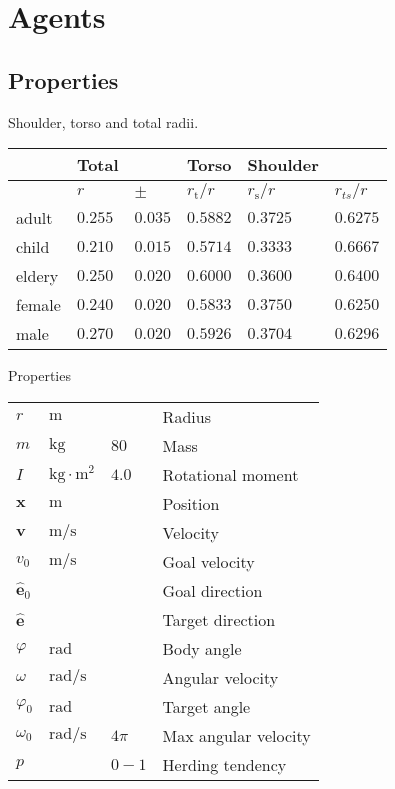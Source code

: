 \section{Agents}
\subsection{Properties}

Shoulder, torso and total radii.

\begin{tabularx}{1.0\linewidth}{ l l l l l l}
& Total && Torso & Shoulder & \\
\hline
& $ r $ & $ \pm $ & $ r_{\text{t}} / r $ & $ r_{\text{s}} / r $ & $ r_{ts} / r $ \\
\hline\hline
adult & $ 0.255 $ & $ 0.035 $ & $ 0.5882 $ & $ 0.3725 $ & $ 0.6275 $ \\
child & $ 0.210 $ & $ 0.015 $ & $ 0.5714 $ & $ 0.3333 $ & $ 0.6667 $ \\
eldery & $ 0.250 $ & $ 0.020 $ & $ 0.6000 $ & $ 0.3600 $ & $ 0.6400 $ \\
female & $ 0.240 $ & $ 0.020 $ & $ 0.5833 $ & $ 0.3750 $ & $ 0.6250 $ \\
male & $ 0.270 $ & $ 0.020 $ & $ 0.5926 $ & $ 0.3704 $ & $ 0.6296 $ \\
\hline
\end{tabularx} 

Properties

\begin{tabularx}{1.0\linewidth}{ l l l l }
\hline
\hline
$ r $                    & $ \mathrm{m} $ &  & Radius \\
$ m $                    & $ \mathrm{kg} $ & $ 80 $ & Mass \\
$ I $                    & $ \mathrm{kg \cdot m^{2}} $ & $ 4.0 $ & Rotational moment \\
\hline
\hline
$ \mathbf{x} $           & $ \mathrm{m} $ &  & Position \\
$ \mathbf{v} $           & $ \mathrm{m} / \mathrm{s} $ &  & Velocity \\
$ v_{0} $                & $ \mathrm{m} / \mathrm{s} $ &  & Goal velocity \\  
$ \hat{\mathbf{e}}_{0} $ &  &  & Goal direction \\
$ \hat{\mathbf{e}} $     &  &  & Target direction \\
\hline
\hline
$ \varphi $              & $ \mathrm{rad} $ &  & Body angle \\
$ \omega $               & $ \mathrm{rad} / \mathrm{s} $ &  & Angular velocity \\
$ \varphi_{0} $          & $ \mathrm{rad} $ &  & Target angle \\
$ \omega_{0} $           & $ \mathrm{rad} / \mathrm{s} $ & $ 4\pi $ & Max angular velocity \\
\hline
\hline
$ p $                    &  & $ 0 - 1 $ & Herding tendency \\
\hline
\hline
\end{tabularx}

